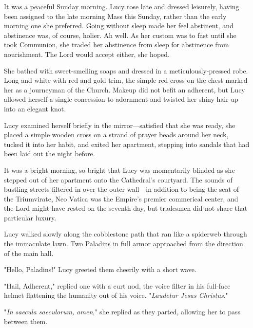 It was a peaceful Sunday morning.  Lucy rose late and dressed leisurely, having
been assigned to the late morning Mass this Sunday, rather than the early
morning one she preferred.  Going without sleep made her feel abstinent, and
abstinence was, of course, holier.  Ah well.  As her custom was to fast until
she took Communion, she traded her abstinence from sleep for abstinence from
nourishment.  The Lord would accept either, she hoped.

She bathed with sweet-smelling soaps and dressed in a meticulously-pressed
robe.  Long and white with red and gold trim, the simple red cross on the chest
marked her as a journeyman of the Church.  Makeup did not befit an adherent,
but Lucy allowed herself a single concession to adornment and twisted her shiny
hair up into an elegant knot.

Lucy examined herself briefly in the mirror---satisfied that she was ready, she
placed a simple wooden cross on a strand of prayer beads around her neck,
tucked it into her habit, and exited her apartment, stepping into sandals that
had been laid out the night before.

It was a bright morning, so bright that Lucy was momentarily blinded as she
stepped out of her apartment onto the Cathedral's courtyard.  The sounds of
bustling streets filtered in over the outer wall---in addition to being the
seat of the Triumvirate, Neo Vatica was the Empire's premier commerical center,
and the Lord might have rested on the seventh day, but tradesmen did not share
that particular luxury.

Lucy walked slowly along the cobblestone path that ran like a spiderweb through
the immaculate lawn.  Two Paladins in full armor approached from the direction
of the main hall.

"Hello, Paladins!"  Lucy greeted them cheerily with a short wave.

"Hail, Adherent," replied one with a curt nod, the voice filter in his
full-face helmet flattening the humanity out of his voice. "\textit{Laudetur
Jesus Christus}."

"\textit{In saecula saeculorum, amen}," she replied as they parted, allowing
her to pass between them.
